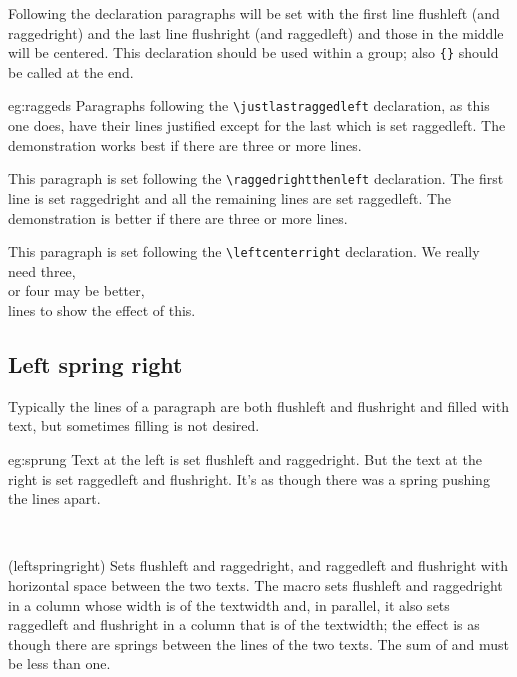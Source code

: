   Following the declaration \cmd{\leftcenteright} paragraphs will be
set with the first line flushleft (and raggedright) and the last line
flushright (and raggedleft) and those in the middle will be centered.
This declaration should be used within a group; also \cmd{\everypar}\verb?{}?
should be called at the end.

\begin{egsource}{eg:raggeds}
\justlastraggedleft
Paragraphs following the \verb?\justlastraggedleft? declaration, as
this one does, have their lines justified except for the last which
is set raggedleft. The demonstration works best if there are three
or more lines.

\raggedrightthenleft
This paragraph is set following the \verb?\raggedrightthenleft?
declaration. The first line is set raggedright and all the remaining
lines are set raggedleft. The demonstration is better if there are three or 
more lines.

\leftcenterright
This paragraph is set following the \verb?\leftcenterright?
declaration. We really need three, \\ or four may be better, \\
lines to show the effect of this.
\everypar{}
\end{egsource}


\subsection{Left spring right}

    Typically the lines of a paragraph are both flushleft and flushright and
filled with text, but sometimes filling is not desired.

\begin{egresult}{eg:sprung}
%
  {Text at the left is set flushleft and raggedright.}
  {But the text at the right is set raggedleft and flushright.
   It's as though there was a spring pushing the lines apart.}
\vspace*{0.25\baselineskip}
\end{egresult}


\begin{syntax}
\cmd{\leftspringright} \\
\end{syntax}
\glossary(leftspringright)%
  {}%
  {Sets  flushleft and raggedright, and  raggedleft
   and flushright with horizontal space between the two texts.}
The \cmd{\leftspringright} macro sets  flushleft and raggedright
in a column whose width is  of the textwidth and, in parallel,
it also sets  raggedleft and flushright in a column that is
 of the textwidth; the effect is as though there are springs 
between the lines of the two texts. The sum of  and  
must be less than one.

